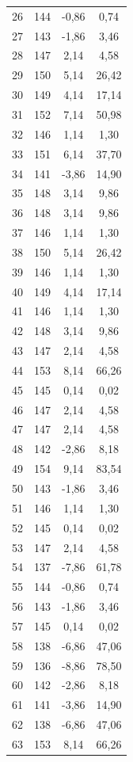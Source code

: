 \begin{xltabular}{\textwidth}{|c|c|c|c|}
	26  & 144 & -0,86 & 0,74  \\
	27  & 143 & -1,86 & 3,46  \\
	28  & 147 & 2,14  & 4,58  \\
	29  & 150 & 5,14  & 26,42 \\
	30  & 149 & 4,14  & 17,14 \\
	31  & 152 & 7,14  & 50,98 \\
	32  & 146 & 1,14  & 1,30  \\
	33  & 151 & 6,14  & 37,70 \\
	34  & 141 & -3,86 & 14,90 \\
	35  & 148 & 3,14  & 9,86  \\
	36  & 148 & 3,14  & 9,86  \\
	37  & 146 & 1,14  & 1,30  \\
	38  & 150 & 5,14  & 26,42 \\
	39  & 146 & 1,14  & 1,30  \\
	40  & 149 & 4,14  & 17,14 \\
	41  & 146 & 1,14  & 1,30  \\
	42  & 148 & 3,14  & 9,86  \\
	43  & 147 & 2,14  & 4,58  \\
	44  & 153 & 8,14  & 66,26 \\
	45  & 145 & 0,14  & 0,02  \\
	46  & 147 & 2,14  & 4,58  \\
	47  & 147 & 2,14  & 4,58  \\
	48  & 142 & -2,86 & 8,18  \\
	49  & 154 & 9,14  & 83,54 \\
	50  & 143 & -1,86 & 3,46  \\
	51  & 146 & 1,14  & 1,30  \\
	52  & 145 & 0,14  & 0,02  \\
	53  & 147 & 2,14  & 4,58  \\
	54  & 137 & -7,86 & 61,78 \\
	55  & 144 & -0,86 & 0,74  \\
	56  & 143 & -1,86 & 3,46  \\
	57  & 145 & 0,14  & 0,02  \\
	58  & 138 & -6,86 & 47,06 \\
	59  & 136 & -8,86 & 78,50 \\
	60  & 142 & -2,86 & 8,18  \\
	61  & 141 & -3,86 & 14,90 \\
	62  & 138 & -6,86 & 47,06 \\
	63  & 153 & 8,14  & 66,26 \\

\end{xltabular}
